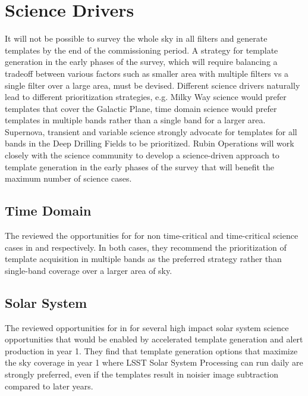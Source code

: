 \section{Science Drivers} \label{sec:science}

It will not be possible to survey the whole sky in all filters and generate templates by the end of the commissioning period. 
A strategy for template generation in the early phases of the survey, which will require balancing a tradeoff between various factors such as smaller area with multiple filters vs a single filter over a large area, must be devised. 
Different science drivers naturally lead to different prioritization strategies, e.g. Milky Way science would prefer templates that cover the Galactic Plane, time domain science would prefer templates in multiple bands rather than a single band for a larger area. 
Supernova, transient and variable science strongly advocate for templates for all bands in the Deep Drilling Fields to be prioritized. 
Rubin Operations will work closely with the science community to develop a science-driven approach to template generation in the early phases of the survey that will benefit the maximum number of science cases. 

\subsection{Time Domain}

The \tvssc reviewed the opportunities for \es for non time-critical and time-critical science cases in \citep{Hambleton_2020} and \citep{Street_2020} respectively. 
In both cases, they recommend the prioritization of template acquisition in multiple bands as the preferred strategy rather than single-band  coverage over a larger area of sky. 

\subsection{Solar System}

The \sssc reviewed opportunities for \es in \citep{2020arXiv201005926L} for several high impact solar system science opportunities that would be enabled by accelerated template generation and alert production in year 1. 
They find that template generation options that maximize the sky coverage in year 1 where LSST Solar System Processing can run daily are strongly preferred, even if the templates result in noisier image subtraction compared to later years.

